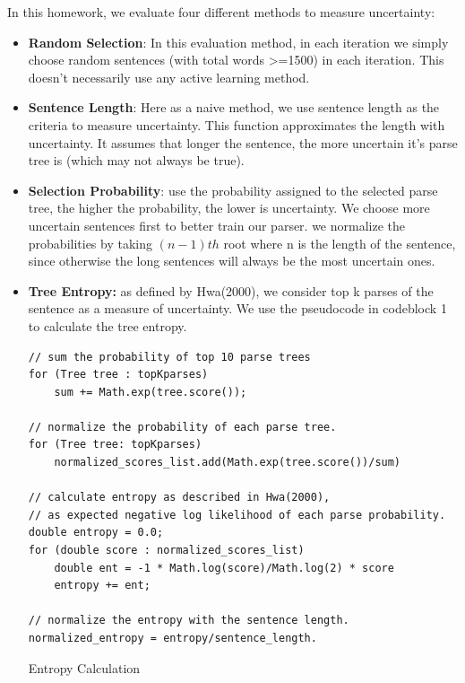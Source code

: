 \documentclass[10pt] {article}
\begin{document}
\noindent In this homework, we evaluate four different methods to measure uncertainty:	
\begin{itemize}
\item \textbf{Random Selection}: In this evaluation method, in each iteration we simply choose random sentences (with total words >=1500) in each iteration. This doesn't necessarily use any active learning method.
\item \textbf{Sentence Length}: Here as a naive method, we use sentence length as the criteria to measure uncertainty. This function approximates the length with uncertainty. It assumes that longer the sentence, the more uncertain it's parse tree is (which may not always be true).
\item \textbf{Selection Probability}: use the probability assigned to the selected parse tree, the higher the probability, the lower is uncertainty. We choose more uncertain sentences first to better train our parser. we normalize the probabilities by taking $(n-1)th$ root where n is the length of the sentence, since otherwise the long sentences will always be the most uncertain ones.
\item \textbf{Tree Entropy:} as defined by Hwa(2000), we consider top k parses of the sentence as a measure of uncertainty. We use the pseudocode in codeblock 1 to calculate the tree entropy.




\begin{listing}[ht!]
\begin{verbatim}
// sum the probability of top 10 parse trees
for (Tree tree : topKparses)
	sum += Math.exp(tree.score());

// normalize the probability of each parse tree.
for (Tree tree: topKparses)
	normalized_scores_list.add(Math.exp(tree.score())/sum)

// calculate entropy as described in Hwa(2000), 
// as expected negative log likelihood of each parse probability.
double entropy = 0.0;
for (double score : normalized_scores_list)
	double ent = -1 * Math.log(score)/Math.log(2) * score
	entropy += ent;

// normalize the entropy with the sentence length.
normalized_entropy = entropy/sentence_length.
\end{verbatim}
\label{lshed}
\caption{Entropy Calculation}
\end{listing}
\end{itemize}
\end{document}
